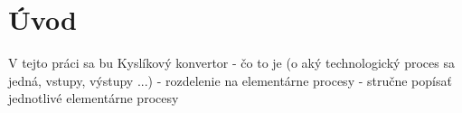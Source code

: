 \setcounter{page}{1}
\setcounter{equation}{0}
\setcounter{figure}{0}
\setcounter{table}{0}

\section*{Úvod}
V tejto práci sa bu
Kyslíkový konvertor
- čo to je (o aký technologický proces sa jedná, vstupy, výstupy ...)
- rozdelenie na elementárne procesy
- stručne popísať jednotlivé elementárne procesy